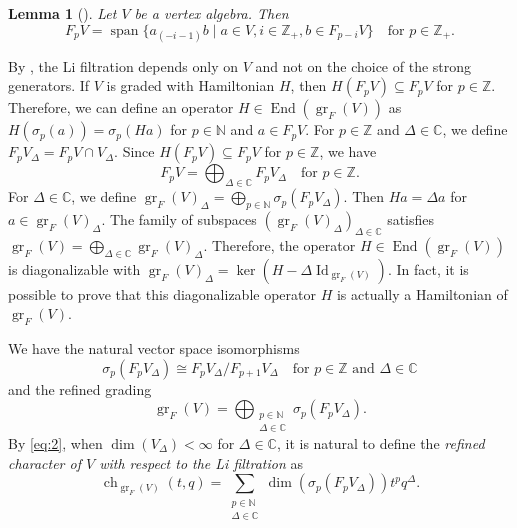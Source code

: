 \documentclass[a4paper, 12pt, reqno]{amsart}
\newtheorem{lemma}[theorem]{Lemma}
\theoremstyle{remark}
\DeclareMathOperator{\ch}{ch}
\DeclareMathOperator{\gr}{gr}
\DeclareMathOperator{\vspan}{span}
\DeclareMathOperator{\End}{End}
\DeclareMathOperator{\Id}{Id}
\begin{document}
\begin{lemma}[{\cite[Lemma 2.9]{li_abelianizing_2005}}]
  \label{lmm:3}
  Let $V$ be a vertex algebra.
  Then
  \begin{equation*}
    F_pV = \vspan\{a_{(-i - 1)}b \mid a \in V, i \in \mathbb{Z}_+, b \in F_{p - i}V\} \quad \text{for $p \in \mathbb{Z}_+$}.
  \end{equation*}
\end{lemma}

By , the Li filtration depends only on $V$ and not on the choice of the strong generators.
If $V$ is graded with Hamiltonian $H$, then $H(F_pV) \subseteq F_pV$ for $p \in \mathbb{Z}$.
Therefore, we can define an operator $H \in \End(\gr_F(V))$ as $H(\sigma_p(a)) = \sigma_p(Ha)$ for $p \in \mathbb{N}$ and $a \in F_pV$.
For $p \in \mathbb{Z}$ and $\Delta \in \mathbb{C}$, we define $F_pV_{\Delta} = F_pV \cap V_{\Delta}$.
Since $H(F_pV) \subseteq F_pV$ for $p \in \mathbb{Z}$, we have
\begin{equation*}
  F_pV = \bigoplus_{\Delta \in \mathbb{C}}F_pV_{\Delta} \quad \text{for $p \in \mathbb{Z}$}.
\end{equation*}
For $\Delta \in \mathbb{C}$, we define $\gr_F(V)_{\Delta} = \bigoplus_{p \in \mathbb{N}}\sigma_p(F_pV_{\Delta})$.
Then $Ha = \Delta a$ for $a \in \gr_F(V)_{\Delta}$.
The family of subspaces $(\gr_F(V)_{\Delta})_{\Delta \in \mathbb{C}}$ satisfies $\gr_F(V) = \bigoplus_{\Delta \in \mathbb{C}}\gr_F(V)_{\Delta}$.
Therefore, the operator $H \in \End(\gr_F(V))$ is diagonalizable with $\gr_F(V)_{\Delta} = \ker(H - \Delta\Id_{\gr_F(V)})$.
In fact, it is possible to prove that this diagonalizable operator $H$ is actually a Hamiltonian of $\gr_F(V)$.

We have the natural vector space isomorphisms
\begin{equation*}
  \sigma_p(F_pV_{\Delta}) \cong F_pV_{\Delta}/F_{p + 1}V_{\Delta} \quad \text{for $p \in \mathbb{Z}$ and $\Delta \in \mathbb{C}$}
\end{equation*}
and the refined grading
\begin{equation}
  \label{eq:2}
  \gr_F(V) = \bigoplus_{\substack{p \in \mathbb{N} \\ \Delta \in \mathbb{C}}}\sigma_p(F_pV_{\Delta}).
\end{equation}
By \eqref{eq:2}, when $\dim(V_{\Delta}) < \infty$ for $\Delta \in \mathbb{C}$, it is natural to define the \emph{refined character of $V$ with respect to the Li filtration} as
\begin{equation*}
  \ch_{\gr_F(V)}(t, q) = \sum_{\substack{p \in \mathbb{N} \\ \Delta \in \mathbb{C}}}\dim(\sigma_p(F_pV_{\Delta}))t^pq^{\Delta}.
\end{equation*}
\end{document}
